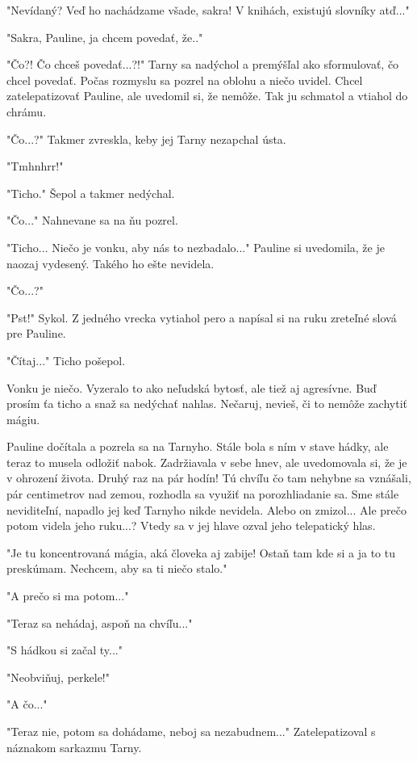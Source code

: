 \documentclass{book}
\begin{document}
"$ $Nevídaný? Veď ho nachádzame všade, sakra! V knihách, existujú slovníky atď..."$ $ 

"$ $Sakra, Pauline, ja chcem povedať, že.."$ $ 

"$ $Čo?! Čo chceš povedať...?!"$ $  Tarny sa nadýchol a premýšľal ako sformulovať, čo chcel povedať. Počas rozmyslu sa pozrel na oblohu a niečo uvidel. Chcel zatelepatizovať Pauline, ale uvedomil si, že nemôže. Tak ju schmatol a vtiahol do chrámu.

"$ $Čo...?"$ $  Takmer zvreskla, keby jej Tarny nezapchal ústa.

"$ $Tmhnhrr!"$ $ 

"$ $Ticho."$ $  Šepol a takmer nedýchal.

"$ $Čo..."$ $  Nahnevane sa na ňu pozrel.

"$ $Ticho... Niečo je vonku, aby nás to nezbadalo..."$ $  Pauline si uvedomila, že je naozaj vydesený. Takého ho ešte nevidela.

"$ $Čo...?"$ $ 

"$ $Pst!"$ $  Sykol. Z jedného vrecka vytiahol pero a napísal si na ruku zreteľné slová pre Pauline.

"$ $Čítaj..."$ $  Ticho pošepol.

Vonku je niečo. Vyzeralo to ako neľudská bytosť, ale tiež aj agresívne. Buď prosím ťa ticho a snaž sa nedýchať nahlas. Nečaruj, nevieš, či to nemôže zachytiť mágiu.

Pauline dočítala a pozrela sa na Tarnyho. Stále bola s ním v stave hádky, ale teraz to musela odložiť nabok. Zadržiavala v sebe hnev, ale uvedomovala si, že je v ohrození života. Druhý raz na pár hodín! Tú chvíľu čo tam nehybne sa vznášali, pár centimetrov nad zemou, rozhodla sa využiť na porozhliadanie sa. Sme stále neviditeľní, napadlo jej keď Tarnyho nikde nevidela. Alebo on zmizol... Ale prečo potom videla jeho ruku...? Vtedy sa v jej hlave ozval jeho telepatický hlas.

"$ $Je tu koncentrovaná mágia, aká človeka aj zabije! Ostaň tam kde si a ja to tu preskúmam. Nechcem, aby sa ti niečo stalo."$ $ 

"$ $A prečo si ma potom..."$ $ 

"$ $Teraz sa nehádaj, aspoň na chvíľu..."$ $ 

"$ $S hádkou si začal ty..."$ $ 

"$ $Neobviňuj, perkele!"$ $ 

"$ $A čo..."$ $ 

"$ $Teraz nie, potom sa dohádame, neboj sa nezabudnem..."$ $  Zatelepatizoval s náznakom sarkazmu Tarny. 
\end{document}
